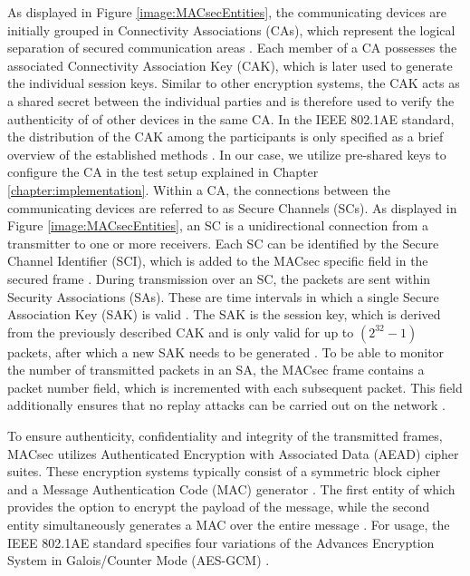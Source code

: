 \documentclass[conference, onecolumn, a4paper]{IEEEtran}
\begin{document}
\noindent As displayed in Figure \ref{image:MACsecEntities}, the communicating devices are initially grouped in Connectivity Associations (CAs), which 
represent the logical separation of secured communication areas \cite[p. 35]{IEEE-802-1AE:2018}. Each member of a CA possesses the associated Connectivity 
Association Key (CAK), which is later used to generate the individual session keys. Similar to other encryption systems, the CAK acts as a shared 
secret between the individual parties and is therefore used to verify the authenticity of of other devices in the same CA. In the IEEE 802.1AE standard, 
the distribution of the CAK among the participants is only specified as a brief overview of the established methods \cite[p. 230]{IEEE-802-1AE:2018}. 
In our case, we utilize pre-shared keys to configure the CA in the test setup explained in Chapter \ref{chapter:implementation}. Within a CA, the 
connections between the communicating devices are referred to as Secure Channels (SCs). As displayed in Figure \ref{image:MACsecEntities}, 
an SC is a unidirectional connection from a transmitter to one or more receivers. Each SC can be identified by the Secure Channel Identifier (SCI), 
which is added to the MACsec specific field in the secured frame \cite[p. 43]{IEEE-802-1AE:2018}. During transmission over an SC, the packets are sent 
within Security Associations (SAs). These are time intervals in which a single Secure Association Key (SAK) is valid \cite[p. 44]{IEEE-802-1AE:2018}. 
The SAK is the session key, which is derived from the previously described CAK and is only valid for up to ${(2^{32} -1)}$ packets, after which a new 
SAK needs to be generated \cite[p. 66]{IEEE-802-1AE:2018}. To be able to monitor the number of transmitted packets in an SA, the MACsec frame contains 
a packet number field, which is incremented with each subsequent packet. This field additionally ensures that no replay attacks can be carried out on 
the network \cite[p. 145]{IEEE-802-1AE:2018}. 

\smallskip
To ensure authenticity, confidentiality and integrity of the transmitted frames, MACsec utilizes Authenticated Encryption with Associated Data (AEAD) 
cipher suites. These encryption systems typically consist of a symmetric block cipher and a Message Authentication Code (MAC) generator 
\cite{NIST-AES_GCM:2007}. The first entity of which provides the option to encrypt the payload of the message, while the second entity simultaneously 
generates a MAC over the entire message \cite{GOOSE_confidentiality_integrity:2020}. For usage, the IEEE 802.1AE standard specifies four variations of 
the Advances Encryption System in Galois/Counter Mode (AES-GCM) \cite[p. 143ff]{IEEE-802-1AE:2018}.
\end{document}

